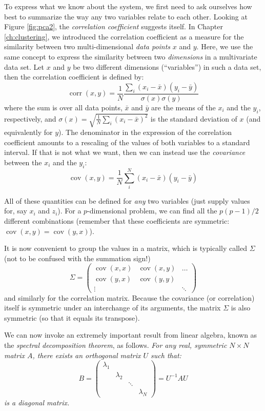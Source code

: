 To express what we know about the system, we first need to ask
ourselves how best to summarize the way any two variables relate to
each other. Looking at Figure \ref{fig:pca2}, the \emph{correlation
  coefficient}  suggests itself.  In Chapter \ref{ch:clustering}, we
introduced the correlation coefficient as a measure for the similarity
between two multi-dimensional \emph{data points} $x$ and $y$. Here, we
use the same concept to express the similarity between two
\emph{dimensions} in a multivariate data set. Let $x$ and $y$ be two
different dimensions (``variables'') in such a data set, then the
correlation coefficient is defined by:
%
\[ 
\operatorname{corr}(x,y) 
  = \frac{1}{N}
    \frac{ \sum_i ( x_i - \bar{x} ) ( y_i - \bar{y} ) } 
         { \sigma(x) \sigma(y) }
\]
%
where the sum is over all data points, $\bar{x}$ and $\bar{y}$ are the
means of the $x_i$ and the $y_i$, respectively, and $\sigma(x) = \sqrt{
  \frac{1}{N} \sum_i (x_i - \bar{x})^2 }$ is the standard deviation of
$x$ (and equivalently for $y$). The denominator in the expression of
the correlation coefficient amounts to a rescaling of the values of
both variables to a standard interval. If that is not what we want,
then we can instead use the \emph{covariance} between the $x_i$ and
the $y_i$:
%
\[ 
\operatorname{cov}(x,y)
   = \frac{1}{N} \sum_i^N ( x_i - \bar{x} ) ( y_i - \bar{y} ) 
\]
%

All of these quantities can be defined for \emph{any} two variables
(just supply values for, say $x_i$ and $z_i$). For a $p$-dimensional
problem, we can find all the $p(p-1)/2$ different combinations
(remember that these coefficients are symmetric:
$\operatorname{cov}(x,y) = \operatorname{cov}(y,x)$).

It is now convenient to group the values in a matrix, which is
typically called $\Sigma$ (not to be confused with the summation
sign!)
%
\[
\Sigma = 
\begin{pmatrix}
\operatorname{cov}(x,x) & \operatorname{cov}(x,y) & \dots \\
\operatorname{cov}(y,x) & \operatorname{cov}(y,y) & \\
\vdots &  & \ddots 
\end{pmatrix}
\]
%
and similarly for the correlation matrix. Because the covariance (or
correlation) itself is symmetric under an interchange of its
arguments, the matrix $\Sigma$ is also symmetric (so that it equals
its transpose).

We can now invoke an extremely important result from linear algebra,
known as the \emph{spectral decomposition theorem},  as follows.
\emph{
For any real, symmetric $N \times N$ matrix $A$, there exists an 
orthogonal matrix $U$ such that:
%
\[
B =
\begin{pmatrix}
\lambda_1 &           &        &           \\
          & \lambda_2 &        &           \\
          &           & \ddots &           \\
          &           &        & \lambda_N
\end{pmatrix}
= U^{-1} A U
\]
is a diagonal matrix.} 

